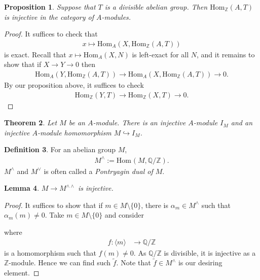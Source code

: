 \documentclass[12pt]{article}
\theoremstyle{plain}
\newtheorem{theorem}{Theorem}[section]
\newtheorem{lemma}[theorem]{Lemma}
\newtheorem{proposition}[theorem]{Proposition}
\theoremstyle{remark}
\theoremstyle{definition}
\newtheorem{definition}[theorem]{Definition}
\newcommand{\Z}{\mathbb{Z}}
\newcommand{\Q}{\mathbb{Q}}
\newcommand{\Hom}[3]{\mathrm{Hom}_{#3}(#1,#2)}
\begin{document}
\begin{proposition}
    Suppose that $T$ is a divisible abelian group. Then $\Hom{A}{T}{\Z}$ is injective in the category of $A$-modules.
\end{proposition}
\begin{proof}
    It suffices to check that
    \begin{align*}
        x\mapsto \Hom{X}{\Hom{A}{T}{\Z}}{A}
    \end{align*}
    is exact. Recall that $x\mapsto \Hom{X}{N}{A}$ is left-exact for all $N$, and it remains to show that if $X\rightarrow Y\rightarrow 0$ then
    \begin{align*}
        \Hom{Y}{\Hom{A}{T}{\Z}}{A}\rightarrow \Hom{X}{\Hom{A}{T}{\Z}}{A} \rightarrow 0.
    \end{align*}
    By our proposition above, it suffices to check
    \begin{align*}
        \Hom{Y}{T}{\Z}\rightarrow \Hom{X}{T}{\Z}\rightarrow 0.
    \end{align*}
\end{proof}

\begin{theorem}\label{Theorem 2.7.8.}
    Let $M$ be an $A$-module. There is an injective $A$-module $I_M$ and an injective $A$-module homomorphism $M\hookrightarrow I_M$.
\end{theorem}

\begin{definition}
    For an abelian group $M$,
    \begin{align*}
        M^\wedge := \Hom{M}{\Q/\Z}{}.
    \end{align*}
    $M^\wedge$ and $M^\vee$ is often called a \emph{Pontryagin dual of $M$}.
\end{definition}

\begin{lemma}
    $M\rightarrow M^{\wedge\wedge}$ is injective.
\end{lemma}
\begin{proof}
    It suffices to show that if $m\in M\setminus\{0\}$, there is $\alpha_m\in M^\wedge$ such that $\alpha_m(m)\neq 0$. Take $m\in M\setminus\{0\}$ and consider
    \begin{figure}[H]
        \centering
    \end{figure}
    \noindent where
    \begin{align*}
        f:\langle m\rangle &\rightarrow \Q/\Z 
    \end{align*}
    is a homomorphism such that $f(m)\neq 0$. As $\Q/\Z$ is divisible, it is injective as a $\Z$-module. Hence we can find such $\tilde{f}$. Note that $\tilde{f}\in M^\wedge$ is our desiring element.
\end{proof}
\end{document}
